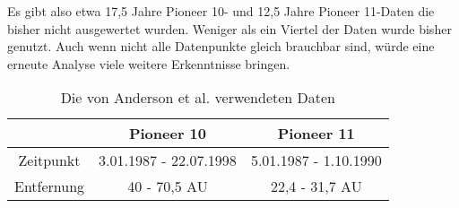 Es gibt also etwa 17,5 Jahre Pioneer 10- und 12,5 Jahre Pioneer 11-Daten die bisher nicht ausgewertet wurden. Weniger als ein Viertel der Daten wurde bisher genutzt. Auch wenn nicht alle Datenpunkte gleich brauchbar sind, würde eine erneute Analyse viele weitere Erkenntnisse bringen.

\begin{table}[ht]
\centering
\begin{tabular}{|c|c|c|}
\hline & Pioneer 10 & Pioneer 11 \\ 
\hline Zeitpunkt & 3.01.1987 - 22.07.1998  & 5.01.1987 - 1.10.1990 \\ 
\hline Entfernung & 40 - 70,5 AU & 22,4 - 31,7 AU \\ 
\hline 
\end{tabular}
\caption{Die von Anderson et al.\cite{Anderson2002} verwendeten Daten}
\label{tab:andersondaten}
\end{table}



